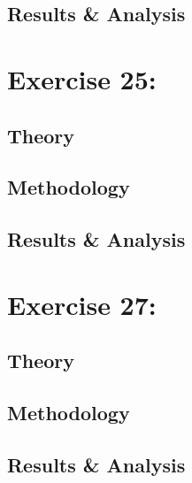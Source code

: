\documentclass[%
reprint,
amsmath,amssymb,
aps,
floatfix
]{revtex4-2}
\begin{document}
		\subsection{Results \& Analysis}
		
	\section{Exercise 25: }
		\subsection{Theory}
		\subsection{Methodology}
		\subsection{Results \& Analysis}
		
	\section{Exercise 27: }
		\subsection{Theory}
		\subsection{Methodology}
		\subsection{Results \& Analysis}
		
	\clearpage
	
	\clearpage
	\onecolumngrid
	\appendix

	
	
\end{document}
